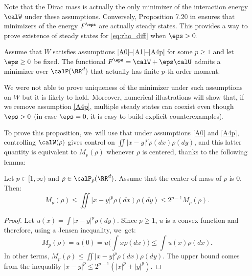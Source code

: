 Note that the Dirac mass is actually the only minimizer of the interaction energy $\calW$ under these assumptions. Conversely, Proposition 7.20 in \cite{otam15} ensures that minimizers of the energy $F^\eps$ are actually steady states. This provides a way to prove existence of steady states for \eqref{eq:rho_diff} when $\eps >0$.


\begin{prop}
Assume that $W$ satisfies assumptions \eqref{A0}--\eqref{A1}--\eqref{A4p} for some $p \geq 1$ and let $\eps \geq 0$ be fixed. The functional $F^\eps = \calW + \eps \calU$ admits a minimizer over $\calP(\RR^d)$ that actually has finite $p$-th order moment.
\end{prop}

\begin{remark}
We were not able to prove uniqueness of the minimizer under such assumptions on $W$ but it is likely to hold. Moreover, numerical illustrations will show that, if we remove assumption \eqref{A4p}, multiple steady states can coexist even though $\eps>0$ (in case $\eps=0$, it is easy to build explicit counterexamples).
\end{remark}
To prove this proposition, we~will use that under assumptions \eqref{A0} and \eqref{A4p}, controlling $\calW(\rho)$ gives control on $\iint |x-y|^p \rho(dx) \rho(dy)$, and this latter quantity is equivalent to $M_p(\rho)$ whenever $\rho$ is centered, thanks to the following lemma:
\begin{lemma}\label{lemma:equivalence_Wp}
Let $p \in [1, \infty)$ and $\rho \in \calP_p(\RR^d)$. Assume that the center of mass of $\rho$ is $0$. Then:
\[
M_p(\rho) \leq \iint |x-y|^p \rho(dx) \rho(dy) \leq 2^{p-1} M_p(\rho).
\]
\end{lemma}

\begin{proof}
Let $u(x) = \int |x-y|^p \rho(dy)$. Since $p \geq 1$, $u$ is a convex function and therefore, using a Jensen inequality, we~get:
\[
M_p(\rho)=u(0) = u \Big(\int x\rho(dx)\Big) \leq \int u(x) \rho(dx).
\]
In other terms, $M_p(\rho) \leq \iint |x-y|^p \rho(dx) \rho(dy)$. The upper bound comes from the inequality $|x-y|^p \leq 2^{p-1} (|x|^p + |y|^p)$.
\end{proof}

